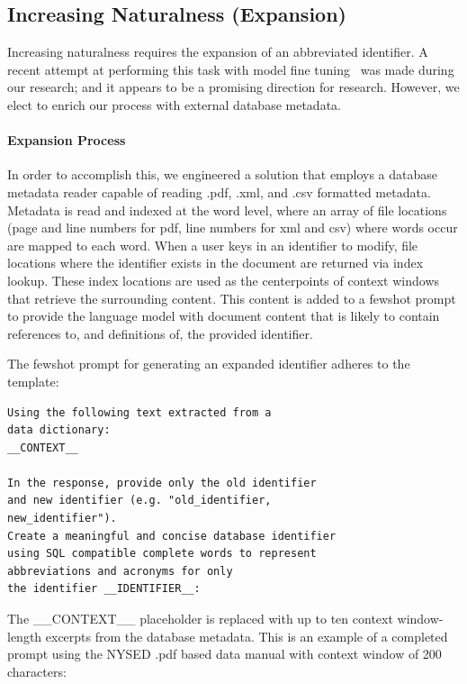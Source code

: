 \subsection{Increasing Naturalness (Expansion)}

Increasing naturalness requires the expansion of an abbreviated identifier.
A recent attempt at performing this task with model fine tuning~\cite{nameguess} was made during our research; and it appears to be a promising direction for research.
However, we elect to enrich our process with external database metadata.

\paragraph{\textbf{Expansion Process}}
In order to accomplish this, we engineered a solution that employs a database metadata reader capable of reading .pdf, .xml, and .csv formatted metadata.
Metadata is read and indexed at the word level, where an array of file locations (page and line numbers for pdf, line numbers for xml and csv) where words occur are mapped to each word.
When a user keys in an identifier to modify, file locations where the identifier exists in the document are returned via index lookup.
These index locations are used as the centerpoints of context windows that retrieve the surrounding content.
This content is added to a fewshot prompt to provide the language model with document content that is likely to contain references to, and definitions of, the provided identifier.

The fewshot prompt for generating an expanded identifier adheres to the template:
\begin{verbatim}
Using the following text extracted from a 
data dictionary:
__CONTEXT__

In the response, provide only the old identifier 
and new identifier (e.g. "old_identifier, 
new_identifier").
Create a meaningful and concise database identifier 
using SQL compatible complete words to represent 
abbreviations and acronyms for only 
the identifier __IDENTIFIER__:
\end{verbatim}

The \_\_CONTEXT\_\_ placeholder is replaced with up to ten context window-length excerpts from the database metadata.
This is an example of a completed prompt using the NYSED .pdf based data manual with context window of 200 characters:


